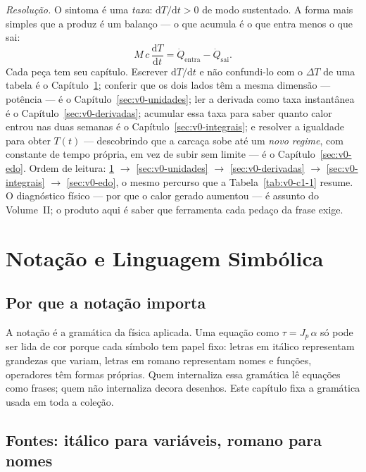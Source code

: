 \documentclass[12pt,a4paper]{article}
\numberwithin{equation}{section}
\numberwithin{table}{section}
\numberwithin{figure}{section}
\begin{document}
\emph{Resolução.} O sintoma é uma \emph{taxa}: $\mathrm{d}T/\mathrm{d}t
> 0$ de modo sustentado. A forma mais simples que a produz é um balanço
--- o que acumula é o que entra menos o que sai:
$$M\,c\,\frac{\mathrm{d}T}{\mathrm{d}t}
  = \dot{Q}_{\mathrm{entra}} - \dot{Q}_{\mathrm{sai}}.$$
Cada peça tem seu capítulo. Escrever $\mathrm{d}T/\mathrm{d}t$ e não
confundi-lo com o $\Delta T$ de uma tabela é o
Capítulo~\ref{sec:v0-notacao}; conferir que os dois lados têm a mesma
dimensão --- potência --- é o Capítulo~\ref{sec:v0-unidades}; ler a
derivada como taxa instantânea é o Capítulo~\ref{sec:v0-derivadas};
acumular essa taxa para saber quanto calor entrou nas duas semanas é o
Capítulo~\ref{sec:v0-integrais}; e resolver a igualdade para obter
$T(t)$ --- descobrindo que a carcaça sobe até um \emph{novo regime}, com
constante de tempo própria, em vez de subir sem limite --- é o
Capítulo~\ref{sec:v0-edo}. Ordem de leitura:
\ref{sec:v0-notacao} $\rightarrow$
\ref{sec:v0-unidades} $\rightarrow$ \ref{sec:v0-derivadas} $\rightarrow$
\ref{sec:v0-integrais} $\rightarrow$ \ref{sec:v0-edo}, o mesmo percurso
que a Tabela~\ref{tab:v0-c1-1} resume. O diagnóstico físico --- por que
o calor gerado aumentou --- é assunto do Volume~II; o produto aqui é
saber que ferramenta cada pedaço da frase exige.


\clearpage
\section{Notação e Linguagem Simbólica}\label{sec:v0-notacao}

\subsection{Por que a notação importa}

A notação é a gramática da física aplicada. Uma equação como
$\tau = J_p\,\alpha$ só pode ser lida de cor porque cada símbolo tem papel
fixo: letras em itálico representam grandezas que variam, letras em romano
representam nomes e funções, operadores têm formas próprias. Quem internaliza
essa gramática lê equações como frases; quem não internaliza decora
desenhos. Este capítulo fixa a gramática usada em toda a coleção.

\subsection{Fontes: itálico para variáveis, romano para nomes}
\end{document}
